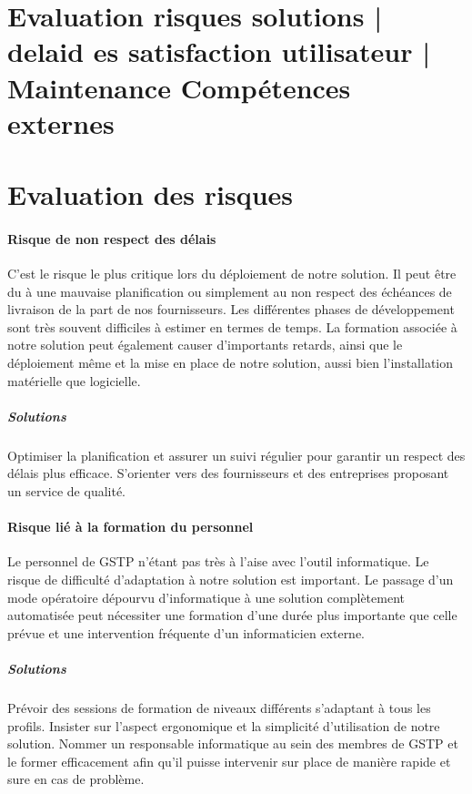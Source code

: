 \begin{description}
\section{Evaluation risques solutions | delaid es satisfaction utilisateur | Maintenance Compétences externes}

\section{Evaluation des risques}

\paragraph{Risque de non respect des délais\\}
C'est le risque le plus critique lors du déploiement de notre solution. Il peut être du à une mauvaise planification ou simplement au non respect des échéances de livraison de la part de nos fournisseurs. Les différentes phases de développement sont très souvent difficiles à estimer en termes de temps.
La formation associée à notre solution peut également causer d'importants retards, ainsi que le déploiement même et la mise en place de notre solution, aussi bien l'installation matérielle que logicielle.

\subparagraph{Solutions\\}
Optimiser la planification et assurer un suivi régulier pour garantir un respect des délais plus efficace. S'orienter vers des fournisseurs et des entreprises proposant un service de qualité.

\paragraph{Risque lié à la formation du personnel\\}
Le personnel de GSTP n'étant pas très à l'aise avec l'outil informatique. Le risque de difficulté d'adaptation à notre solution est important. Le passage d'un mode opératoire dépourvu d'informatique à une solution complètement automatisée peut nécessiter une formation d'une durée plus importante que celle prévue et une intervention fréquente d'un informaticien externe.

\subparagraph{Solutions\\}
Prévoir des sessions de formation de niveaux différents s'adaptant à tous les profils. Insister sur l'aspect ergonomique et la simplicité d'utilisation
de notre solution. Nommer un responsable informatique au sein des membres de GSTP et le former efficacement afin qu'il puisse intervenir sur place de manière rapide et sure en cas de problème.



\end{description}
